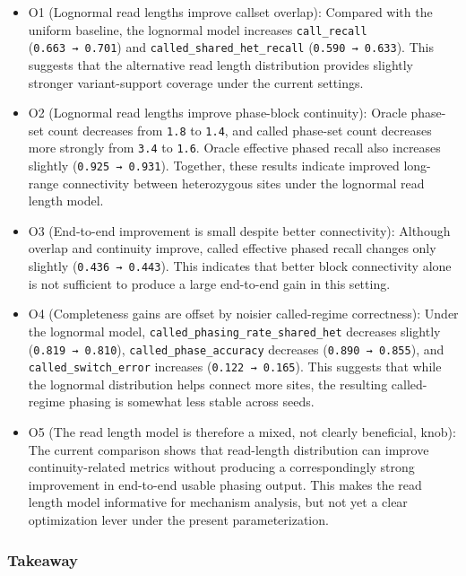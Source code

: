 \documentclass[
]{article}
\begin{document}
\begin{itemize}
\item
  O1 (Lognormal read lengths improve callset overlap): Compared with the
  uniform baseline, the lognormal model increases \texttt{call\_recall}
  (\texttt{0.663\ →\ 0.701}) and \texttt{called\_shared\_het\_recall}
  (\texttt{0.590\ →\ 0.633}). This suggests that the alternative read
  length distribution provides slightly stronger variant-support
  coverage under the current settings.
\item
  O2 (Lognormal read lengths improve phase-block continuity): Oracle
  phase-set count decreases from \texttt{1.8} to \texttt{1.4}, and
  called phase-set count decreases more strongly from \texttt{3.4} to
  \texttt{1.6}. Oracle effective phased recall also increases slightly
  (\texttt{0.925\ →\ 0.931}). Together, these results indicate improved
  long-range connectivity between heterozygous sites under the lognormal
  read length model.
\item
  O3 (End-to-end improvement is small despite better connectivity):
  Although overlap and continuity improve, called effective phased
  recall changes only slightly (\texttt{0.436\ →\ 0.443}). This
  indicates that better block connectivity alone is not sufficient to
  produce a large end-to-end gain in this setting.
\item
  O4 (Completeness gains are offset by noisier called-regime
  correctness): Under the lognormal model,
  \texttt{called\_phasing\_rate\_shared\_het} decreases slightly
  (\texttt{0.819\ →\ 0.810}), \texttt{called\_phase\_accuracy} decreases
  (\texttt{0.890\ →\ 0.855}), and \texttt{called\_switch\_error}
  increases (\texttt{0.122\ →\ 0.165}). This suggests that while the
  lognormal distribution helps connect more sites, the resulting
  called-regime phasing is somewhat less stable across seeds.
\item
  O5 (The read length model is therefore a mixed, not clearly
  beneficial, knob): The current comparison shows that read-length
  distribution can improve continuity-related metrics without producing
  a correspondingly strong improvement in end-to-end usable phasing
  output. This makes the read length model informative for mechanism
  analysis, but not yet a clear optimization lever under the present
  parameterization.
\end{itemize}

\subsubsection{Takeaway}\label{takeaway-4}
\end{document}
